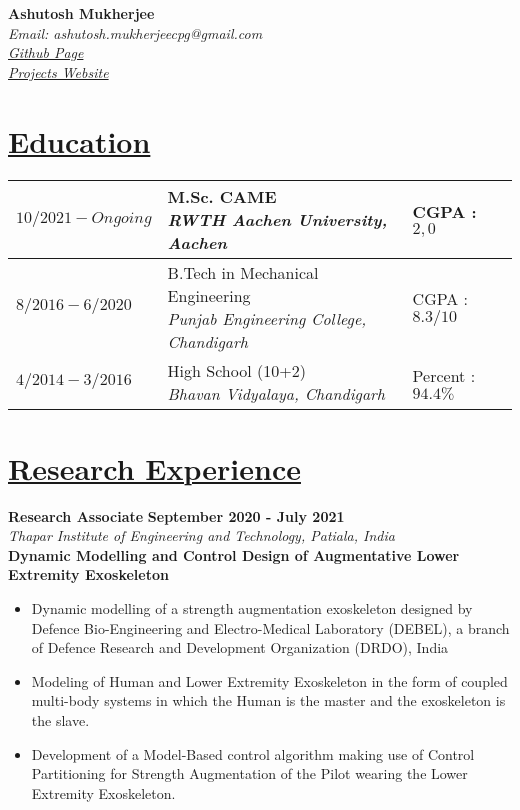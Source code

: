 \documentclass{article}
\makeatletter
\renewcommand{\maketitle}{
\begin{center}
\Large{\textbf{Ashutosh Mukherjee}}\\
\large{\textit{Email: ashutosh.mukherjeecpg@gmail.com}}\\
\href{https://github.com/average-engineer}{\large{\textit{Github Page}}}\\
\href{https://average-engineer.github.io/Projects-Website-Ashutosh-Mukherjee/}{\large{\textit{Projects Website}}}\\
\end{center}}
\def\masters{\large{M.Sc. CAME}}
\def\mastersgrade{\large{CGPA : $2,0$}}
\def\rwth{\large{\textit{RWTH Aachen University, Aachen}}}
\def\degree{\large{B.Tech in Mechanical Engineering}}
\def\college{\large{\textit{Punjab Engineering College, Chandigarh}}}
\def\school{\large{High School (10+2)}}
\def\sname{\large{\textit{Bhavan Vidyalaya, Chandigarh}}}
\def\cgpa{\large{CGPA : $8.3/10$}}
\def\boards{\large{Percent : $94.4\%$}}
\def\drdodate{\large{\textbf{September 2020 - July 2021}}}
\makeatother
\begin{document}
\maketitle
\vspace{-1 em}
\hrulefill %
\vspace{-0.1 in}
\section{\underline{Education}}
\vspace{-1.5 em}
\begin{table}[H]
\centering
\begin{tabular}{|m{1.5in}|m{3in}|m{1.5in}|}
\hline 
\large{$10/2021 - Ongoing$} & \thead{\masters \\[0.1 in] \rwth}\ & \mastersgrade \\ 
\hline 
\large{$8/2016 - 6/2020$} & \thead{\degree \\[0.1 in] \college} &  \cgpa\\ 
\hline
\large{$4/2014 - 3/2016$} & \thead{\school \\[0.1 in] \sname} & \boards \\
\hline
\end{tabular}
\end{table}
\vspace{0 in}

\section{\underline{Research Experience}}
\large{\textbf{Research Associate}}
\hspace{4.1 in}
\drdodate\\
\textit{\large{Thapar Institute of Engineering and Technology, Patiala, India}}\\
\textbf{Dynamic Modelling and Control Design of Augmentative Lower Extremity Exoskeleton}
\begin{itemize}
\item \large{Dynamic modelling of a strength augmentation exoskeleton designed by Defence Bio-Engineering and Electro-Medical Laboratory (DEBEL), a branch of Defence Research and Development Organization (DRDO), India}
\item\large{Modeling of Human and Lower Extremity Exoskeleton in the form of coupled multi-body systems in which the Human is the master and the exoskeleton is the slave.}
\item\large{Development of a Model-Based control algorithm making use of Control Partitioning for Strength Augmentation of the Pilot wearing the Lower Extremity Exoskeleton.}
\end{itemize}
\end{document}

